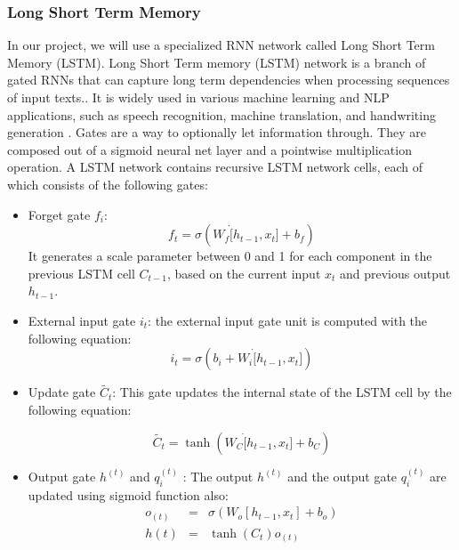 \subsubsection{Long Short Term Memory}
In our project, we will use a specialized RNN network called Long Short Term Memory (LSTM).
%
Long Short Term memory (LSTM) network is a branch of gated RNNs that can capture long term dependencies when processing sequences of input texts..
%
It is widely used in various machine learning and NLP applications, such as speech recognition, machine translation, and handwriting generation\cite{hochreiter1997lstm} .
%
Gates are a way to optionally let information through. They are composed out of a sigmoid neural net layer and a pointwise multiplication operation. 
%
A LSTM network contains recursive LSTM network cells, each of which consists of the following gates:
\begin {itemize}
\item {Forget gate \(f_i\):} 
\[ f_t =  \sigma (W_f \dot [h_{t-1} , x_t] + b_f ) \]
%
It generates a scale parameter between 0 and 1 for each component in the previous LSTM cell $C_{t-1}$, based on the current input $x_t$ and previous output \( h_{t-1} \).
%

\item {External input gate \(i_t \): } the external input gate unit is computed with the following equation:
\[i_t = \sigma (b_i +  W_i  \dot [h_{t-1}, x_t] ) \]

\item {Update gate \( \tilde{C_t} \):} 
This gate updates the internal state of the LSTM cell by the following equation:
\begin{small}
\[  \tilde{C_t} = \tanh (W_C \dot [h_{t-1}, x_t ] + b_C )  \]
\end{small}

\item {Output gate \(h^{(t)}\) and \(q_i^{(t)}\) :}  The output \(h^{(t)}\)
and the output gate \(q_i^{(t)}\) are updated using sigmoid function also:
\begin{eqnarray*}
o_{(t)} &=& \sigma (W_o [h_{t-1} , x_t ] + b_o ) \\
h{(t)} &=& \tanh (C_t) o_{(t)}
\end{eqnarray*}

\end{itemize}



